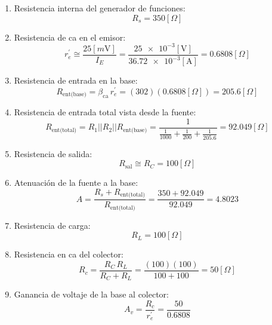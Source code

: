 \begin{enumerate}
\item Resistencia interna del generador de funciones:
\begin{equation*}
    R_s = 350[\Omega]
\end{equation*}
\item Resistencia de ca en el emisor:
\begin{equation*}
    r_e^{'} \cong \frac{25[m{\text{V}}]}{I_E}
            = \frac{\num{25e-3}[\text{V}]}{\num{36.72e-3}[\text{A}]}
            = 0.6808[\Omega]
\end{equation*}
\item Resistencia de entrada en la base:
\begin{equation*}
    R_{\text{ent(base)}} = \beta_{\text{ca}}\,r_e^{'}
                         = (302)(0.6808[\Omega])
                         = 205.6[\Omega]
\end{equation*}
\item Resistencia de entrada total vista desde la fuente:
\begin{equation*}
    R_{\text{ent(total)}} = R_1 || R_2 || R_{\text{ent(base)}}
                          = \dfrac{1}{\frac{1}{1000}+\frac{1}{200}+\frac{1}{205.6}}
                          = 92.049[\Omega]
\end{equation*}
\item Resistencia de salida:
\begin{equation*}
    R_{\text{sal}} \cong R_C
                   = 100[\Omega]
\end{equation*}
\item Atenuación de la fuente a la base:
\begin{equation*}
    A = \frac{R_s+R_{\text{ent(total)}}}{R_{\text{ent(total)}}}
      = \frac{350+92.049}{92.049}
      = 4.8023
\end{equation*}
\item Resistencia de carga:
\begin{equation*}
    R_L = 100[\Omega]
\end{equation*}
\item Resistencia en ca del colector:
\begin{equation*}
    R_c = \frac{R_C\,R_L}{R_C+R_L}
        = \frac{(100)(100)}{100+100}
        = 50[\Omega]
\end{equation*}
\item Ganancia de voltaje de la base al colector:
\begin{equation*}
    A_v = \frac{R_c}{r_e^{'}}
        = \frac{50}{0.6808}

\end{equation*}
\end{enumerate}
